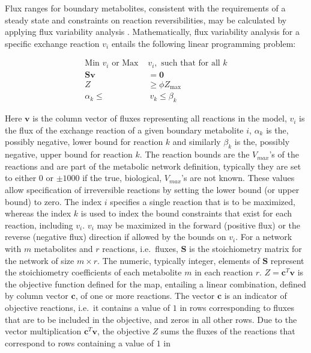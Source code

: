 \documentclass[10pt,a4paper,onecolumn]{article}
\begin{document}
Flux ranges for boundary metabolites, consistent with the requirements
of a steady state and constraints on reaction reversibilities, may be
calculated by applying flux variability analysis
\autocite{Mahadevan2003}. Mathematically, flux variability analysis for
a specific exchange reaction \(v_i\) entails the following linear
programming problem:

\begin{align}
\text{Min } v_i \text{ or Max } &v_i, \text{ such that for all } k \nonumber \\
\bm{S} \bm{v} &= \bm{0} \nonumber \\
Z  &\geq \phi Z_{\text{max}} \nonumber \\
\alpha_k \leq & ~ v_k \leq \beta_k 
\end{align}

Here \(\bm{v}\) is the column vector of fluxes representing all
reactions in the model, \(v_i\) is the flux of the exchange reaction of
a given boundary metabolite \(i\), \(\alpha_k\) is the, possibly
negative, lower bound for reaction \(k\) and similarly \(\beta_k\) is
the, possibly negative, upper bound for reaction \(k\). The reaction
bounds are the \(V_{max}\)'s of the reactions and are part of the
metabolic network definition, typically they are set to either \(0\) or
\(\pm 1000\) if the true, biological, \(V_{max}\)'s are not known. These
values allow specification of irreversible reactions by setting the
lower bound (or upper bound) to zero. The index \(i\) specifies a single
reaction that is to be maximized, whereas the index \(k\) is used to
index the bound constraints that exist for each reaction, including
\(v_i\). \(v_i\) may be maximized in the forward (positive flux) or the
reverse (negative flux) direction if allowed by the bounds on \(v_i\).
For a network with \(m\) metabolites and \(r\) reactions, i.e.~fluxes,
\(\bm{S}\) is the stoichiometry matrix for the network of size
\(m \times r\). The numeric, typically integer, elements of \(\bm{S}\)
represent the stoichiometry coefficients of each metabolite \(m\) in
each reaction \(r\). \(Z = \bm{c}^T \bm{v}\) is the objective function
defined for the map, entailing a linear combination, defined by column
vector \(\bm{c}\), of one or more reactions. The vector \(\bm{c}\) is an
indicator of objective reactions, i.e.~it contains a value of \(1\) in
rows corresponding to fluxes that are to be included in the objective,
and zeros in all other rows. Due to the vector multiplication
\(\bm{c}^T \bm{v}\), the objective \(Z\) sums the fluxes of the
reactions that correspond to rows containing a value of \(1\) in
\end{document}
